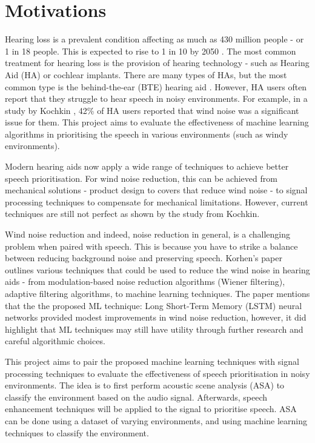\documentclass[logo,bsc,singlespacing,parskip,online]{infthesis}
\begin{document}
\section{Motivations}
Hearing loss is a prevalent condition affecting as much as 
430 million people - or 1 in 18 people. This is expected 
to rise to 1 in 10 by 2050 \cite{WHO2024deafness}.
The most common treatment for hearing loss is the 
provision of hearing technology - such as Hearing Aid (HA) or cochlear implants.
There are many types of HAs, but the most common
type is the behind-the-ear (BTE) hearing aid \cite{Kochkin2010MarkeTrak8}.
However, HA users often report that they struggle to hear speech
in noisy environments. For example, in a study by Kochkin \cite{Kochkin2010MarkeTrak8},
42\% of HA users reported that wind noise was a significant issue for them.
This project aims to evaluate the effectiveness of machine learning algorithms
in prioritising the speech in various environments (such as windy environments).

Modern hearing aids now apply a wide range of techniques to achieve 
better speech prioritisation. For wind noise reduction, this can be achieved 
from mechanical solutions - product design to covers that reduce wind noise - to 
signal processing techniques to compensate for mechanical limitations.
However, current techniques are still not perfect as shown by the study from Kochkin.

Wind noise reduction and indeed, noise reduction in general, is a challenging problem
when paired with speech. This is because you have 
to strike a balance between reducing background noise and
preserving speech. 
Korhen's paper \cite{Korhonen2021WindNoise} outlines 
various techniques that could be used to reduce the wind noise in hearing aids -
from modulation-based noise reduction algorithms (Wiener filtering),
adaptive filtering algorithms, to machine learning techniques.
The paper mentions that the the proposed ML technique:
Long Short-Term Memory (LSTM) neural networks provided
modest improvements in wind noise reduction, however, it did highlight
that ML techniques may still have utility through further research 
and careful algorithmic choices. 

This project aims to pair the proposed machine learning techniques with
signal processing techniques to evaluate the effectiveness of 
speech prioritisation in noisy environments. The idea is to first 
perform acoustic scene analysis (ASA) to classify the environment
based on the audio signal. Afterwards, speech enhancement 
techniques will be applied to the signal to prioritise speech.
ASA can be done using a dataset of varying environments, and 
using machine learning techniques to classify the environment.
\end{document}
